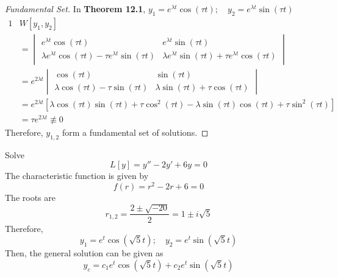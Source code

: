 \documentclass[diffeq.tex]{subfiles}
\begin{document}
\begin{proof}[Fundamental Set]
    In \textbf{Theorem 12.1}, $y_{1} = e^{\lambda t}\cos(\tau t);\quad y_{2} = e^{\lambda t}\sin(\tau t)$
    \begin{alignat}{1}
        &W[y_{1}, y_{2}]\\
        &= \begin{vmatrix}
            e^{\lambda t}\cos(\tau t) & e^{\lambda t}\sin(\tau t)\\
            \lambda e^{\lambda t}\cos(\tau t) - \tau e^{\lambda t}\sin(\tau t) & \lambda e^{\lambda t}\sin(\tau t) + \tau e^{\lambda t}\cos(\tau t)
        \end{vmatrix}\\
        &= e^{2\lambda t}\begin{vmatrix}
            \cos(\tau t) & \sin(\tau t)\\
            \lambda \cos(\tau t) - \tau\sin(\tau t) & \lambda\sin(\tau t) + \tau\cos(\tau t)
        \end{vmatrix}\\
        &= e^{2\lambda t}[\lambda\cos(\tau t)\sin(\tau t) + \tau\cos^{2}(\tau t) - \lambda\sin(\tau t)\cos(\tau t) + \tau\sin^{2}(\tau t)]\\
        &= \tau e^{2\lambda t} \nequiv 0
    \end{alignat}
    Therefore, $y_{1,2}$ form a fundamental set of solutions.
\end{proof}
\begin{example}
    Solve
    \begin{equation}
        L[y] = y'' - 2y' + 6y = 0
    \end{equation}
    The characteristic function is given by
    \begin{equation}
        f(r) = r^{2} - 2r + 6 = 0
    \end{equation}
    The roots are
    \begin{equation}
        r_{1,2} = \frac{2 \pm \sqrt{-20}}{2} = 1 \pm i\sqrt{5}
    \end{equation}
    Therefore,
    \begin{equation}
        y_{1} = e^{t}\cos\left(\sqrt{5}t\right);\quad y_{2} = e^{t}\sin(\sqrt{5}t)
    \end{equation}
    Then, the general solution can be given as
    \begin{equation}
        y_{c} = c_{1}e^{t}\cos(\sqrt{5}t) + c_{2}e^{t}\sin(\sqrt{5}t)
    \end{equation}
\end{example}
\end{document}
